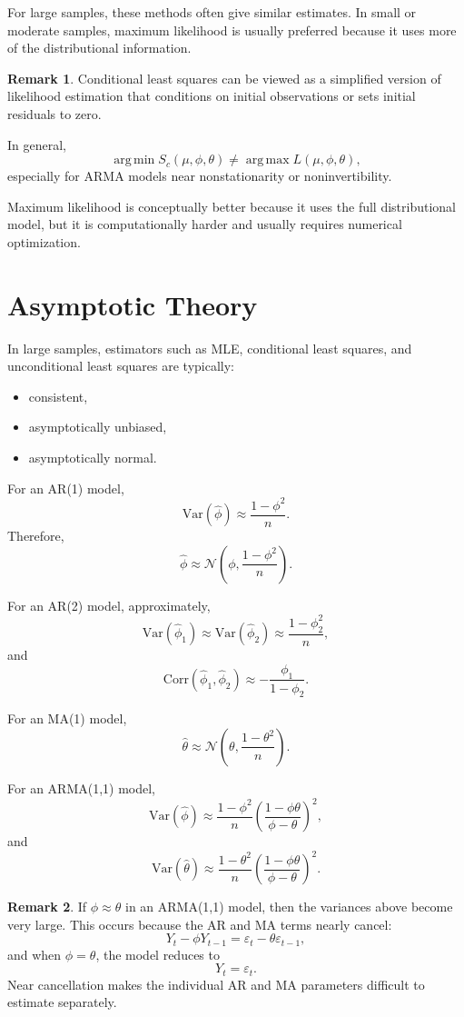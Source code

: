 \documentclass[12pt,oneside]{book}
\numberwithin{equation}{section}
\theoremstyle{definition}
\newtheorem{remark}{Remark}[section]
\theoremstyle{plain}
\theoremstyle{remark}
\newcommand{\Var}{\mathrm{Var}}
\newcommand{\Corr}{\mathrm{Corr}}
\newcommand{\argmin}{\operatorname*{arg\,min}}
\newcommand{\argmax}{\operatorname*{arg\,max}}
\newcommand{\Normal}{\mathcal{N}}
\begin{document}
For large samples, these methods often give similar estimates. In small or moderate samples, maximum likelihood is usually preferred because it uses more of the distributional information.

\begin{remark}
Conditional least squares can be viewed as a simplified version of likelihood estimation that conditions on initial observations or sets initial residuals to zero.
\end{remark}

In general,
\[
\argmin S_c(\mu,\phi,\theta)
\neq
\argmax L(\mu,\phi,\theta),
\]
especially for ARMA models near nonstationarity or noninvertibility.

Maximum likelihood is conceptually better because it uses the full distributional model, but it is computationally harder and usually requires numerical optimization.

\section*{Asymptotic Theory}

In large samples, estimators such as MLE, conditional least squares, and unconditional least squares are typically:

\begin{itemize}
\item consistent,
\item asymptotically unbiased,
\item asymptotically normal.
\end{itemize}

For an AR(1) model,
\[
\Var(\widehat{\phi})
\approx
\frac{1-\phi^2}{n}.
\]
Therefore,
\[
\widehat{\phi}
\approx
\Normal\left(\phi,\frac{1-\phi^2}{n}\right).
\]

For an AR(2) model, approximately,
\[
\Var(\widehat{\phi}_1)
\approx
\Var(\widehat{\phi}_2)
\approx
\frac{1-\phi_2^2}{n},
\]
and
\[
\Corr(\widehat{\phi}_1,\widehat{\phi}_2)
\approx
-\frac{\phi_1}{1-\phi_2}.
\]

For an MA(1) model,
\[
\widehat{\theta}
\approx
\Normal\left(\theta,\frac{1-\theta^2}{n}\right).
\]

For an ARMA(1,1) model,
\[
\Var(\widehat{\phi})
\approx
\frac{1-\phi^2}{n}
\left(
\frac{1-\phi\theta}{\phi-\theta}
\right)^2,
\]
and
\[
\Var(\widehat{\theta})
\approx
\frac{1-\theta^2}{n}
\left(
\frac{1-\phi\theta}{\phi-\theta}
\right)^2.
\]

\begin{remark}
If $\phi\approx\theta$ in an ARMA(1,1) model, then the variances above become very large. This occurs because the AR and MA terms nearly cancel:
\[
Y_t-\phi Y_{t-1}
=
\varepsilon_t-\theta\varepsilon_{t-1},
\]
and when $\phi=\theta$, the model reduces to
\[
Y_t=\varepsilon_t.
\]
Near cancellation makes the individual AR and MA parameters difficult to estimate separately.
\end{remark}
\end{document}
